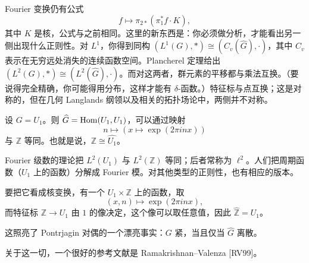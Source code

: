 Fourier 变换仍有公式
\[
f\longmapsto\pi_{2*}(\pi_1^*f\cdot K),
\]
其中 $K$ 是核，公式与之前相同。这里的新东西是：你必须做分析，才能看出另一侧出现什么正则性。对 $L^1$，你得到同构 $(L^1(G),*)\cong(C_v(\widehat{G}),\cdot)$，其中 $C_v$ 表示在无穷远处消失的连续函数空间。Plancherel 定理给出 $(L^2(G),*)\cong(L^2(\widehat{G}),\cdot)$。而对这两者，群元素的平移都与乘法互换。（要说得完全精确，你可能得用分布，这样才能有 $\delta$-函数。）特征标与点互换；这是对称的，但在几何 Langlands 纲领以及相关的拓扑场论中，两侧并不对称。


\begin{example}[Fourier 级数]
设 $G=U_1$。则 $\widehat{G}=\operatorname{Hom}(U_1,U_1)$，可以通过映射
\[
n\longmapsto(x\longmapsto\exp(2\pi i n x))
\]
与 $\mathbb{Z}$ 等同。也就是说，$\mathbb{Z}\cong\widehat{U_1}$。
\end{example}

Fourier 级数的理论把 $L^2(U_1)$ 与 $L^2(\mathbb{Z})$ 等同；后者常称为 $\ell^2$。人们把周期函数（$U_1$ 上的函数）分解成 Fourier 模。对其他类型的正则性，也有相应的版本。

要把它看成核变换，有一个 $U_1\times\mathbb{Z}$ 上的函数，取
\[
(x,n)\longmapsto\exp(2\pi i n x),
\]
而特征标 $\mathbb{Z}\to U_1$ 由 $1$ 的像决定，这个像可以取任意值，因此 $\widehat{\mathbb{Z}}=U_1$。

这照亮了 Pontrjagin 对偶的一个漂亮事实：$G$ 紧，当且仅当 $\widehat{G}$ 离散。

关于这一切，一个很好的参考文献是 Ramakrishnan–Valenza [RV99]。
